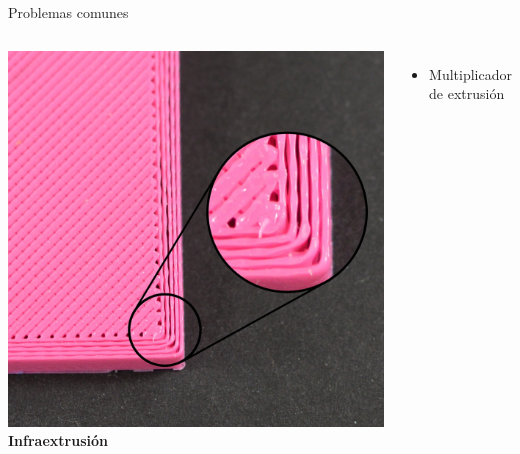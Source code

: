 \documentclass{beamer}
\begin{document}
	\begin{frame}{Problemas comunes}
		\begin{columns}
				\includegraphics[width=\textwidth]{images/Under-Extruding}
				\textbf{Infraextrusión}
				\begin{itemize}
					\item Multiplicador de extrusión
				\end{itemize}
		\end{columns}
	\end{frame}
\end{document}
